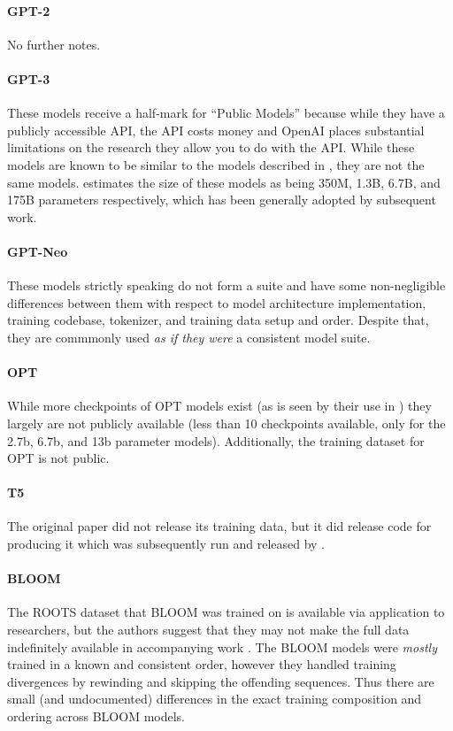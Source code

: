 \documentclass{article}
\theoremstyle{plain}
\theoremstyle{definition}
\theoremstyle{remark}
\begin{document}
\paragraph{GPT-2 \citep{radford2019language}} No further notes.

\paragraph{GPT-3 \citep{brown2020language}} These models receive a half-mark for ``Public Models'' because while they have a publicly accessible API, the API costs money and OpenAI places substantial limitations on the research they allow you to do with the API. While these models are known to be similar to the models described in \citet{brown2020language}, they are not the same models. \citet{gao2021sizes} estimates the size of these models as being 350M, 1.3B, 6.7B, and 175B parameters respectively, which has been generally adopted by subsequent work. 

\paragraph{GPT-Neo \citep{black2021gpt,gpt-j,black2022gpt}} These models strictly speaking do not form a suite and have some non-negligible differences between them with respect to model architecture implementation, training codebase, tokenizer, and training data setup and order. Despite that, they are commmonly used \textit{as if they were} a consistent model suite.

\paragraph{OPT \citep{zhang2022opt}} While more checkpoints of OPT models exist (as is seen by their use in \citet{xia2022training}) they largely are not publicly available (less than 10 checkpoints available, only for the 2.7b, 6.7b, and 13b parameter models). Additionally, the training dataset for OPT is not public.

\paragraph{T5 \citep{raffel2020exploring}} The original paper did not release its training data, but it did release code for producing it which was subsequently run and released by \citet{dodge2021documenting}.

\paragraph{BLOOM \citep{scao2022bloom}} The ROOTS dataset that BLOOM was trained on is available via application to researchers, but the authors suggest that they may not make the full data indefinitely available in accompanying work \citep{jernite2022data,mcmillan2022documenting}. The BLOOM models were \textit{mostly} trained in a known and consistent order, however they handled training divergences by rewinding and skipping the offending sequences. Thus there are small (and undocumented) differences in the exact training composition and ordering across BLOOM models.
\end{document}

